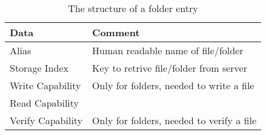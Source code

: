 \begin{table}
  \centering
  \caption{The structure of a folder entry}
  \begin{tabular}{ | l | l |}
    \hline
    \textbf{Data}       & \textbf{Comment}                          \\ \hline
     Alias              & Human readable name of file/folder        \\ \hline
     Storage Index      & Key to retrive file/folder from server    \\ \hline
     Write Capability   & Only for folders, needed to write a file  \\ \hline
     Read Capability    &                                           \\ \hline
     Verify Capability  & Only for folders, needed to verify a file  \\ \hline
  \end{tabular}
  \label{tbl:folder:contents}
\end{table}
